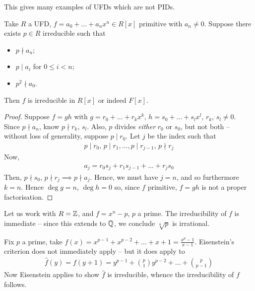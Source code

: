 \documentclass{../../template/note}
\begin{document}
    \begin{remark*}
        This gives many examples of UFDs which are not PIDs.
    \end{remark*}
    

    \begin{theorem}
        Take $R$ a UFD, $f = a_0 + \dots + a_n x^n \in R[x]$ primitive with $a_n \neq 0$. Suppose there exists $p \in R$ irreducible such that
        \begin{itemize}
            \item $p \nmid a_n$;
            \item $p \mid a_i$ for $0 \leq i < n$;
            \item $p^2 \nmid a_0$.
        \end{itemize}
        Then $f$ is irreducible in $R[x]$ or indeed $F[x]$.        
    \end{theorem}

    \begin{proof}
        Suppose $f=gh$ with $g = r_0 + \dots + r_kx^k$, $h = s_0 + \dots + s_lx^l$, $r_k$, $s_l \neq 0$. Since $p \nmid a_n$, know $p \nmid r_k$, $s_l$. Also, $p$ divides \emph{either} $r_0$ or $s_0$, but not both -- without loss of generality, suppose $p \mid r_0$. Let $j$ be the index such that
        \begin{align*}
            p \mid r_0,\, p \mid r_1, \dots, p \mid r_{j-1},\, p \nmid r_j
        \end{align*}
        Now,
        \begin{align*}
            a_j = r_0s_j + r_1s_{j-1} + \dots + r_js_0
        \end{align*}
        Then, $p \nmid s_0$, $p \nmid r_j \implies p \nmid a_j$. Hence, we must have $j=n$, and so furthermore $k=n$. Hence $\deg g = n$, $\deg h = 0$ so, since $f$ primitive, $f=gh$ is not a proper factorisation.       
    \end{proof}
    
    \begin{example*}
        Let us work with $R=\mathbb Z$, and $f=x^n-p$, $p$ a prime. The irreducibility of $f$ is immediate -- since this extends to $\mathbb Q$, we conclude $\sqrt[n]{p}$ is irrational.
    \end{example*}
    
    \begin{example*}
        Fix $p$ a prime, take $f(x) = x^{p-1} + x^{p-2} + \dots + x + 1 = \frac{x^p-1}{x-1}$. Eisenstein's criterion does not immediately apply -- but it does apply to
        \begin{align*}
            \hat f(y) = f(y+1) = y^{p-1} + \binom p 1 y^{p-2} + \dots + \binom p {p-1}
        \end{align*}
        Now Eisenstein applies to show $\hat f$ is irreducible, whence the irreducibility of $f$ follows.
    \end{example*}
    
\end{document}
